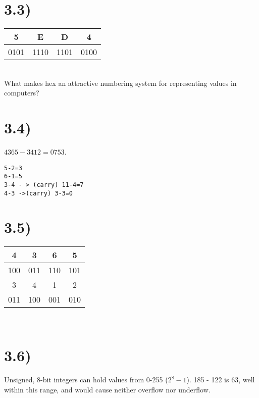 \documentclass[a4paper,11pt]{article}
\begin{document}
\section*{3.3)} 

\begin{tabular}{| c | c | c | c | }
  \hline			
  5 & E & D & 4  \\
  \hline
  0101 & 1110 & 1101 & 0100  \\
  \hline  
\end{tabular} \\

What makes hex an attractive numbering system for representing values in computers?


\section*{3.4)} 

$4365 - 3412 = 0753$.  

\begin{verbatim}
5-2=3
6-1=5
3-4 - > (carry) 11-4=7
4-3 ->(carry) 3-3=0
\end{verbatim}


\section*{3.5)} 

\begin{tabular}{| c | c | c | c | }
  \hline			
  4 & 3 & 6 & 5  \\
  \hline
  100 & 011 & 110 & 101  \\
  \hline  
   \hline			
  3 & 4 & 1 & 2  \\
  \hline
  011 & 100 & 001 & 010  \\
  \hline  
\end{tabular} \\




\section*{3.6)} 
Unsigned, 8-bit integers can hold values from 0-255 ($2^8 - 1$).  185 - 122 is 63, well within this range, and would cause neither overflow nor underflow.
\end{document}
